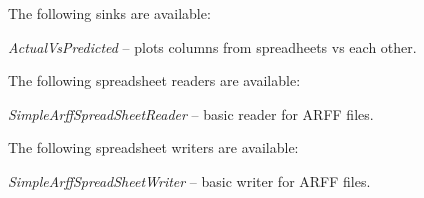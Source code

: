 \documentclass[a4paper]{book}
\begin{document}
The following sinks are available:
\begin{tight_itemize}
  \item \textit{ActualVsPredicted} -- plots columns from spreadheets vs
  each other.
\end{tight_itemize}

The following spreadsheet readers are available:
\begin{tight_itemize}
  \item \textit{SimpleArffSpreadSheetReader} -- basic reader for ARFF files.
\end{tight_itemize}

The following spreadsheet writers are available:
\begin{tight_itemize}
  \item \textit{SimpleArffSpreadSheetWriter} -- basic writer for ARFF files.
\end{tight_itemize}



\end{document}
